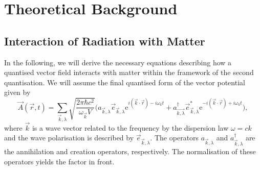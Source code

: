 \chapter{Theoretical Background}\label{sec:background}
\section{Interaction of Radiation with Matter}\label{RadMatter}
In the following, we will derive the necessary equations describing how a quantised vector field interacts with matter within the framework of the second quantisation. We will assume the final quantised form of the vector potential \cite{QOptic,KerneII} given by
\begin{equation} \label{quantised}
	\vec{A}(\vec{r},t) = \sum_{\vec{k},\lambda} \sqrt{\frac{2\pi\hbar c^2}{\omega_{\vec{k}} V}} \bigg(a_{\vec{k},\lambda}\vec{e}_{\vec{k},\lambda}\text{e}^{i(\vec{k}\cdot \vec{r})-i\omega_k t}+a_{\vec{k,\lambda}}^\dagger\vec{e}_{\vec{k},\lambda}^*\text{e}^{-i(\vec{k}\cdot \vec{r})+i\omega_k t}\bigg),
\end{equation}
where $\vec{k}$ is a wave vector related to the frequency by the dispersion law $\omega=ck$ and the wave polarisation is described by $\vec{e}_{\vec{k},\lambda}$. The operators $a_{\vec{k},\lambda}$ and $a_{\vec{k},\lambda}^\dagger$ are the annihilation and creation operators, respectively. The normalisation of these operators yields the factor in front. 

